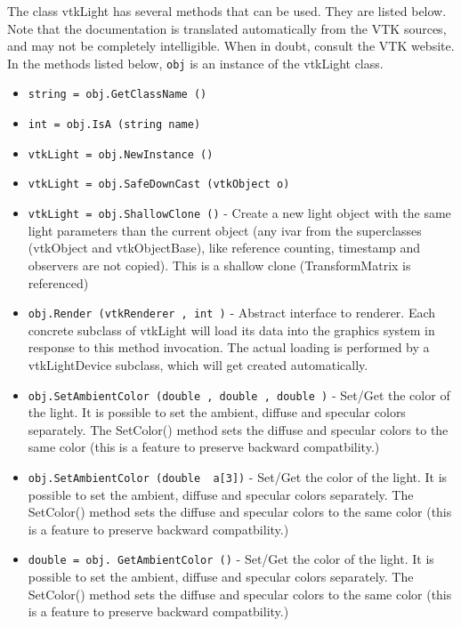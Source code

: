 The class vtkLight has several methods that can be used.
  They are listed below.
Note that the documentation is translated automatically from the VTK sources,
and may not be completely intelligible.  When in doubt, consult the VTK website.
In the methods listed below, \verb|obj| is an instance of the vtkLight class.
\begin{itemize}
\item  \verb|string = obj.GetClassName ()|

\item  \verb|int = obj.IsA (string name)|

\item  \verb|vtkLight = obj.NewInstance ()|

\item  \verb|vtkLight = obj.SafeDownCast (vtkObject o)|

\item  \verb|vtkLight = obj.ShallowClone ()| -  Create a new light object with the same light parameters than the current
 object (any ivar from the superclasses (vtkObject and vtkObjectBase),
 like reference counting, timestamp and observers are not copied).
 This is a shallow clone (TransformMatrix is referenced)

\item  \verb|obj.Render (vtkRenderer , int )| -  Abstract interface to renderer. Each concrete subclass of vtkLight
 will load its data into the graphics system in response to this method
 invocation. The actual loading is performed by a vtkLightDevice
 subclass, which will get created automatically.

\item  \verb|obj.SetAmbientColor (double , double , double )| -  Set/Get the color of the light. It is possible to set the ambient,
 diffuse and specular colors separately. The SetColor() method sets
 the diffuse and specular colors to the same color (this is a feature
 to preserve backward compatbility.)

\item  \verb|obj.SetAmbientColor (double  a[3])| -  Set/Get the color of the light. It is possible to set the ambient,
 diffuse and specular colors separately. The SetColor() method sets
 the diffuse and specular colors to the same color (this is a feature
 to preserve backward compatbility.)

\item  \verb|double = obj. GetAmbientColor ()| -  Set/Get the color of the light. It is possible to set the ambient,
 diffuse and specular colors separately. The SetColor() method sets
 the diffuse and specular colors to the same color (this is a feature
 to preserve backward compatbility.)


\end{itemize}
